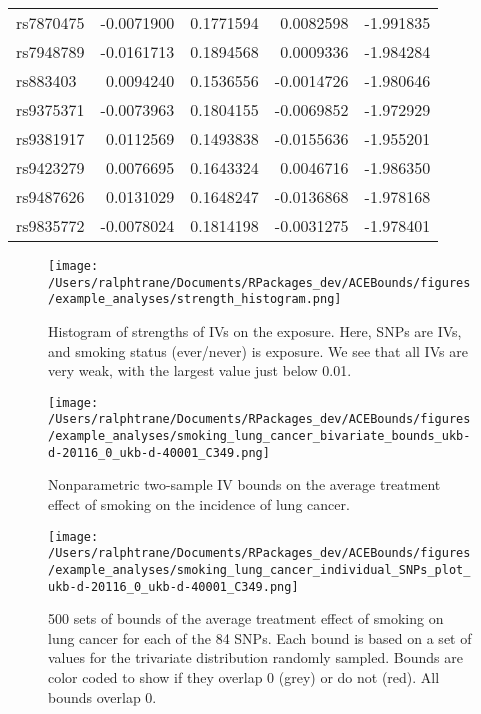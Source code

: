 \documentclass[
]{article}
\theoremstyle{plain}
\begin{document}
\begin{longtable}[t]{lrrrr}
rs7870475 & -0.0071900 & 0.1771594 & 0.0082598 & -1.991835\\
rs7948789 & -0.0161713 & 0.1894568 & 0.0009336 & -1.984284\\
rs883403 & 0.0094240 & 0.1536556 & -0.0014726 & -1.980646\\
rs9375371 & -0.0073963 & 0.1804155 & -0.0069852 & -1.972929\\
\addlinespace
rs9381917 & 0.0112569 & 0.1493838 & -0.0155636 & -1.955201\\
rs9423279 & 0.0076695 & 0.1643324 & 0.0046716 & -1.986350\\
rs9487626 & 0.0131029 & 0.1648247 & -0.0136868 & -1.978168\\
rs9835772 & -0.0078024 & 0.1814198 & -0.0031275 & -1.978401\\*
\end{longtable}

\begin{figure}[H]
 \center
 \texttt{[image: /Users/ralphtrane/Documents/RPackages\_dev/ACEBounds/figures/example\_analyses/strength\_histogram.png]}
 \caption{Histogram of strengths of IVs on the exposure. Here, SNPs are IVs, and smoking status (ever/never) is exposure. We see that all IVs are very weak, with the largest value just below 0.01.}
 \label{fig:strength_histogram}
\end{figure}

\begin{figure}[H]
  \center
  \texttt{[image: /Users/ralphtrane/Documents/RPackages\_dev/ACEBounds/figures/example\_analyses/smoking\_lung\_cancer\_bivariate\_bounds\_ukb-d-20116\_0\_ukb-d-40001\_C349.png]}
  \caption{Nonparametric two-sample IV bounds on the average treatment effect of smoking on the incidence of lung cancer.}
  \label{fig:smoking_on_lung_cancer_ind_bounds}
\end{figure}

\clearpage

\begin{sidewaysfigure}
  \center
  \texttt{[image: /Users/ralphtrane/Documents/RPackages\_dev/ACEBounds/figures/example\_analyses/smoking\_lung\_cancer\_individual\_SNPs\_plot\_ukb-d-20116\_0\_ukb-d-40001\_C349.png]}
  \caption{500 sets of bounds of the average treatment effect of smoking on lung cancer for each of the 84 SNPs. Each bound is based on a set of values for the trivariate distribution randomly sampled. Bounds are color coded to show if they overlap 0 (grey) or do not (red). All bounds overlap 0.}
  \label{fig:smoking_on_lung_cancer_tri_bounds_all}
\end{sidewaysfigure}
\end{document}

